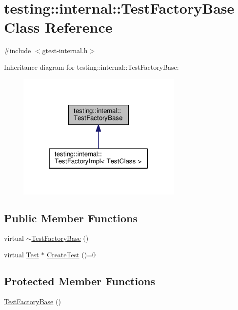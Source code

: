 \hypertarget{classtesting_1_1internal_1_1TestFactoryBase}{}\section{testing\+:\+:internal\+:\+:Test\+Factory\+Base Class Reference}
\label{classtesting_1_1internal_1_1TestFactoryBase}


{\ttfamily \#include $<$gtest-\/internal.\+h$>$}



Inheritance diagram for testing\+:\+:internal\+:\+:Test\+Factory\+Base\+:\nopagebreak
\begin{figure}[H]
\begin{center}
\leavevmode
\includegraphics[width=231pt]{classtesting_1_1internal_1_1TestFactoryBase__inherit__graph}
\end{center}
\end{figure}
\subsection*{Public Member Functions}
\begin{DoxyCompactItemize}
\item 
virtual \hyperlink{classtesting_1_1internal_1_1TestFactoryBase_a18f22a7594336a36642289c1decddc9e}{$\sim$\+Test\+Factory\+Base} ()
\item 
virtual \hyperlink{classtesting_1_1Test}{Test} $\ast$ \hyperlink{classtesting_1_1internal_1_1TestFactoryBase_a07ac3ca0b196cdb092da0bb186b7c030}{Create\+Test} ()=0
\end{DoxyCompactItemize}
\subsection*{Protected Member Functions}
\begin{DoxyCompactItemize}
\item 
\hyperlink{classtesting_1_1internal_1_1TestFactoryBase_afedbf147b2a213517b315880d8c81427}{Test\+Factory\+Base} ()
\end{DoxyCompactItemize}


